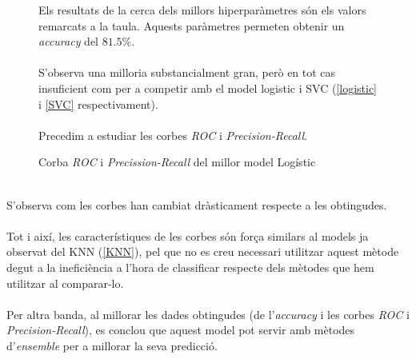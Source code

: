 \documentclass[a4paper, 11pt]{article}
\begin{document}
\begin{figure}[h]
\begin{minipage}{6.5cm}
Els resultats de la cerca dels millors hiperparàmetres són els valors remarcats a la taula. Aquests paràmetres permeten obtenir un \textit{accuracy} del $81.5\%$.\\\\ 
S'observa una milloria substancialment gran, però en tot cas insuficient com per a competir amb el model logistic i SVC (\textcolor{blue}{\ref{logistic}} i \textcolor{blue}{\ref{SVC}} respectivament).\\\\
Precedim a estudiar les corbes \textit{ROC} i \textit{Precision-Recall}.
\end{minipage} %
\end{figure} %
\begin{figure}[h]
\centering
    \caption{Corba \textit{ROC} i \textit{Precission-Recall} del millor model Logístic}
    \label{fig:my_label}
\end{figure}\\
S'observa com les corbes han cambiat dràsticament respecte a les obtingudes.\\\\
Tot i així, les característiques de les corbes són força similars al models ja observat del KNN (\textcolor{blue}{\ref{KNN}}), pel que no es creu necessari utilitzar aquest mètode degut a la ineficiència a l'hora de classificar respecte dels mètodes que hem utilitzar al comparar-lo.\\\\
Per altra banda, al millorar les dades obtingudes (de l'\textit{accuracy} i les corbes \textit{ROC} i \textit{Precision-Recall}), es conclou que aquest model pot servir amb mètodes d'\textit{ensemble} per a millorar la seva predicció.
\newpage
\end{document}
